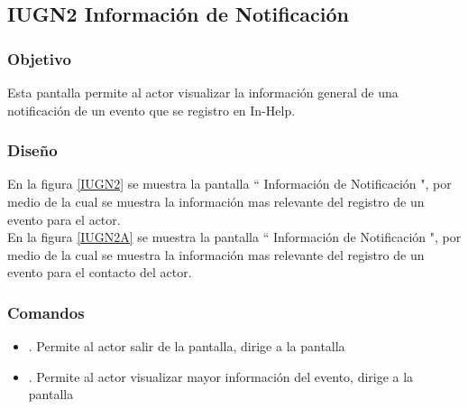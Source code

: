 \subsection{IUGN2  Información de Notificación}

\subsubsection{Objetivo}

	
    Esta pantalla permite al actor visualizar la información general de una notificación de un evento que se registro en In-Help.

\subsubsection{Diseño}


    En la figura \ref{IUGN2} se muestra la pantalla `` Información de Notificación ", por medio de la cual se muestra la información mas relevante del registro de un evento para el actor.\\
    En la figura \ref{IUGN2A} se muestra la pantalla `` Información de Notificación ", por medio de la cual se muestra la información mas relevante del registro de un evento para el contacto del actor.\\


\subsubsection{Comandos}
    \begin{itemize}
    	\item \btnRegresar[Regresar]. Permite al actor salir de la pantalla, dirige a la pantalla 
    	\item \btnDetalles[Detalles]. Permite al actor visualizar mayor información del evento, dirige a la pantalla 
    \end{itemize}

